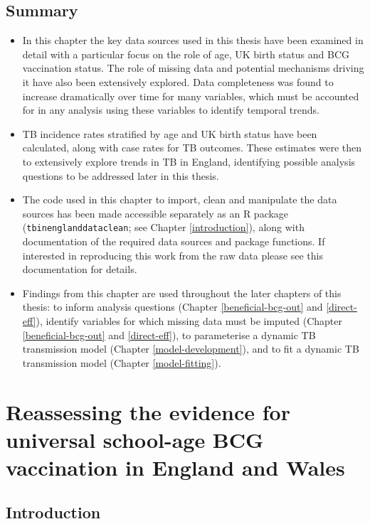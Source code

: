 \documentclass[11pt,twoside]{bristolthesis}
\begin{document}
  \hypertarget{summary-3}{%
  \section{Summary}\label{summary-3}}
  \begin{itemize}
  \item
    In this chapter the key data sources used in this thesis have been examined in detail with a particular focus on the role of age, UK birth status and BCG vaccination status. The role of missing data and potential mechanisms driving it have also been extensively explored. Data completeness was found to increase dramatically over time for many variables, which must be accounted for in any analysis using these variables to identify temporal trends.
  \item
    TB incidence rates stratified by age and UK birth status have been calculated, along with case rates for TB outcomes. These estimates were then to extensively explore trends in TB in England, identifying possible analysis questions to be addressed later in this thesis.
  \item
    The code used in this chapter to import, clean and manipulate the data sources has been made accessible separately as an R package (\texttt{tbinenglanddataclean}; see Chapter \ref{introduction}), along with documentation of the required data sources and package functions. If interested in reproducing this work from the raw data please see this documentation for details.
  \item
    Findings from this chapter are used throughout the later chapters of this thesis: to inform analysis questions (Chapter \ref{beneficial-bcg-out} and \ref{direct-eff}), identify variables for which missing data must be imputed (Chapter \ref{beneficial-bcg-out} and \ref{direct-eff}), to parameterise a dynamic TB transmission model (Chapter \ref{model-development}), and to fit a dynamic TB transmission model (Chapter \ref{model-fitting}).
  \end{itemize}
  \hypertarget{sutherland}{%
  \chapter{Reassessing the evidence for universal school-age BCG vaccination in England and Wales}\label{sutherland}}
  
  \hypertarget{introduction-3}{%
  \section{Introduction}\label{introduction-3}}
  
\end{document}
